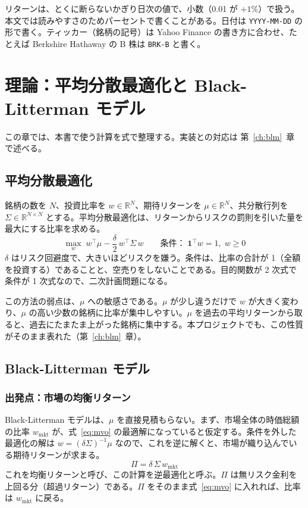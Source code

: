 \documentclass[xelatex,ja=standard,jafont=hiragino-pron,a4paper,10pt]{bxjsreport}
\newcommand{\code}[1]{\texttt{#1}}
\newcommand{\chapref}[1]{第~\ref{#1}~章}
\begin{document}
リターンは、とくに断らないかぎり日次の値で、小数（0.01 が $+1\%$）で扱う。本文では読みやすさのためパーセントで書くことがある。日付は \code{YYYY-MM-DD} の形で書く。ティッカー（銘柄の記号）は Yahoo Finance の書き方に合わせ、たとえば Berkshire Hathaway の B 株は \code{BRK-B} と書く。

\chapter{理論：平均分散最適化と Black-Litterman モデル}\label{ch:theory}

この章では、本書で使う計算を式で整理する。実装との対応は \chapref{ch:blm} で述べる。

\section{平均分散最適化}

銘柄の数を $N$、投資比率を $w \in \mathbb{R}^N$、期待リターンを $\mu \in \mathbb{R}^N$、共分散行列を $\Sigma \in \mathbb{R}^{N \times N}$ とする。平均分散最適化は、リターンからリスクの罰則を引いた量を最大にする比率を求める。
\begin{equation}
\max_{w}\; w^\top \mu - \frac{\delta}{2}\, w^\top \Sigma\, w
\qquad \text{条件：}\; \mathbf{1}^\top w = 1,\; w \ge 0
\label{eq:mvo}
\end{equation}
$\delta$ はリスク回避度で、大きいほどリスクを嫌う。条件は、比率の合計が 1（全額を投資する）であることと、空売りをしないことである。目的関数が 2 次式で条件が 1 次式なので、二次計画問題になる。

この方法の弱点は、$\mu$ への敏感さである。$\mu$ が少し違うだけで $w$ が大きく変わり、$\mu$ の高い少数の銘柄に比率が集中しやすい。$\mu$ を過去の平均リターンから取ると、過去にたまたま上がった銘柄に集中する。本プロジェクトでも、この性質がそのまま表れた（\chapref{ch:blm}）。

\section{Black-Litterman モデル}

\subsection{出発点：市場の均衡リターン}

Black-Litterman モデルは、$\mu$ を直接見積もらない。まず、市場全体の時価総額の比率 $w_{\mathrm{mkt}}$ が、式~\eqref{eq:mvo} の最適解になっていると仮定する。条件を外した最適化の解は $w = (\delta\Sigma)^{-1}\mu$ なので、これを逆に解くと、市場が織り込んでいる期待リターンが求まる。
\begin{equation}
\Pi = \delta\, \Sigma\, w_{\mathrm{mkt}}
\label{eq:implied}
\end{equation}
これを均衡リターンと呼び、この計算を逆最適化と呼ぶ。$\Pi$ は無リスク金利を上回る分（超過リターン）である。$\Pi$ をそのまま式~\eqref{eq:mvo} に入れれば、比率は $w_{\mathrm{mkt}}$ に戻る。
\end{document}
